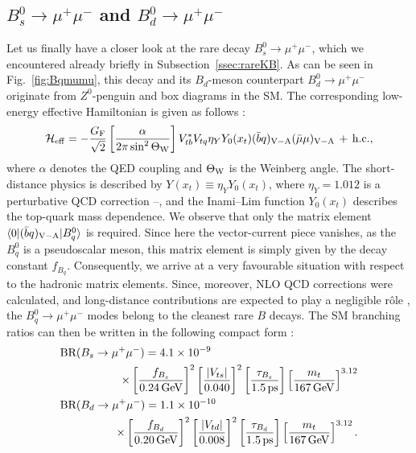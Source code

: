 \documentclass[12pt]{article}
\begin{document}
\subsection{$B^0_s\to\mu^+\mu^-$ and $B^0_d\to\mu^+\mu^-$}\label{ssec:Bmumu}
\unboldmath
%
%
%
Let us finally have a closer look at the rare decay $B^0_s\to\mu^+\mu^-$,
which we encountered already briefly in Subsection~\ref{ssec:rareKB}. 
As can be seen in Fig.~\ref{fig:Bqmumu}, this decay and its $B_d$-meson
counterpart $B^0_d\to\mu^+\mu^-$ originate from $Z^0$-penguin and
box diagrams in the SM. The corresponding low-energy effective Hamiltonian 
is given as follows \cite{B-LH98}:
\begin{equation}\label{Heff-Bmumu}
{\cal H}_{\rm eff}=-\frac{G_{\rm F}}{\sqrt{2}}\left[
\frac{\alpha}{2\pi\sin^2\Theta_{\rm W}}\right]
V_{tb}^\ast V_{tq} \eta_Y Y_0(x_t)(\bar b q)_{\rm V-A}(\bar\mu\mu)_{\rm V-A} 
\,+\, {\rm h.c.},
\end{equation}
where $\alpha$ denotes the QED coupling and $\Theta_{\rm W}$ is the
Weinberg angle. The short-distance physics is described by 
$Y(x_t)\equiv\eta_Y Y_0(x_t)$, where $\eta_Y=1.012$ is a perturbative 
QCD correction \cite{BB-Bmumu}--\cite{MiU}, and the Inami--Lim function
$Y_0(x_t)$ describes the top-quark mass dependence. We observe that
only the matrix element $\langle 0| (\bar b q)_{\rm V-A}|B^0_q\rangle$ 
is required. Since here the vector-current piece vanishes, as
the $B^0_q$ is a pseudoscalar meson, this matrix element is simply
given by the decay constant $f_{B_q}$. 
Consequently, we arrive at a very favourable 
situation with respect to the hadronic matrix elements. Since, moreover, 
NLO QCD corrections were calculated, and long-distance contributions are 
expected to play a negligible r\^ole \cite{BB-Bmumu}, the $B^0_q\to\mu^+\mu^-$ 
modes belong to the cleanest rare $B$ decays. The SM branching ratios
can then be written in the following compact form \cite{Brev01}:
\begin{eqnarray}
\lefteqn{\mbox{BR}( B_s \to \mu^+ \mu^-) = 4.1 \times 10^{-9}}\nonumber\\
&&\qquad\qquad\times \left[\frac{f_{B_s}}{0.24 \, \mbox{GeV}} \right]^2 \left[
\frac{|V_{ts}|}{0.040} \right]^2 \left[
\frac{\tau_{B_s}}{1.5 \, \mbox{ps}} \right] \left[ \frac{m_t}{167 
\, \mbox{GeV} } \right]^{3.12}\label{BR-Bsmumu}\\
\lefteqn{\mbox{BR}(B_d \to \mu^+ \mu^-) = 1.1 \times 10^{-10}}\nonumber\\
&&\qquad\qquad\times\left[ \frac{f_{B_d}}{0.20 \, \mbox{GeV}} \right]^2 \left[
\frac{|V_{td}|}{0.008} \right]^2
\left[ \frac{\tau_{B_d}}{1.5 \, \mbox{ps}} \right] \left[
\frac{m_t}{167 \, \mbox{GeV} } \right]^{3.12}.\label{BR-Bdmumu}
\end{eqnarray}
\end{document}
